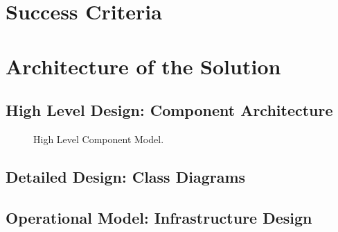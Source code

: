 \documentclass[12pt]{article} %
\begin{document}
	
	

	
	
	
	\section{Success Criteria} %
	
	
	\section{Architecture of the Solution}
		
	\subsection{High Level Design: Component Architecture}
	
	
		\begin{figure}[H] %
			\caption{High Level Component Model.}
			\label{fig:speciation}
		\end{figure}
	
	\subsection{Detailed Design: Class Diagrams}
	
	\subsection{Operational Model: Infrastructure Design}
	
\end{document}
